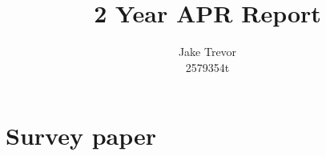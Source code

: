 \documentclass{article}
\title{2\ts{nd} Year APR Report}
\author{Jake Trevor\\2579354t}
\begin{document}
\maketitle
















\appendix

\section{Survey paper} \label{appendix-survey}

\end{document}
